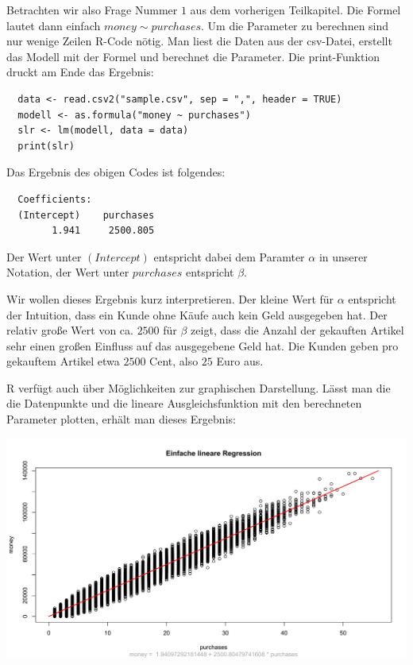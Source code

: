 Betrachten wir also Frage Nummer $1$ aus dem vorherigen Teilkapitel. Die Formel lautet dann einfach $money \sim purchases$. Um die Parameter zu berechnen sind nur wenige Zeilen R-Code nötig. Man liest die Daten aus der csv-Datei, erstellt das Modell mit der Formel und berechnet die Parameter. Die print-Funktion druckt am Ende das Ergebnis:

\begin{lstlisting}
  data <- read.csv2("sample.csv", sep = ",", header = TRUE)
  modell <- as.formula("money ~ purchases")
  slr <- lm(modell, data = data)
  print(slr)
\end{lstlisting}

Das Ergebnis des obigen Codes ist folgendes:

\begin{lstlisting}
  Coefficients:
  (Intercept)    purchases
        1.941     2500.805
\end{lstlisting}

Der Wert unter $(Intercept)$ entspricht dabei dem Paramter $\alpha$ in unserer Notation, der Wert unter $purchases$ entspricht $\beta$.

Wir wollen dieses Ergebnis kurz interpretieren. Der kleine Wert für $\alpha$ entspricht der Intuition, dass ein Kunde ohne Käufe auch kein Geld ausgegeben hat. Der relativ große Wert von ca. $2500$ für $\beta$ zeigt, dass die Anzahl der gekauften Artikel sehr einen großen Einfluss auf das ausgegebene Geld hat. Die Kunden geben pro gekauftem Artikel etwa $2500$ Cent, also $25$ Euro aus.

R verfügt auch über Möglichkeiten zur graphischen Darstellung. Lässt man die die Datenpunkte und die lineare Ausgleichsfunktion mit den berechneten Parameter plotten, erhält man dieses Ergebnis:

\includegraphics[width=\textwidth]{r-simpleLinearRegression}

